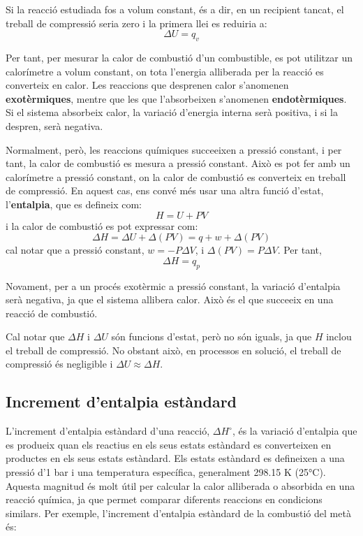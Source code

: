 Si la reacció estudiada fos a volum constant, és a dir, en un recipient tancat, el treball de compressió seria zero i la primera llei es reduiria a:
\begin{equation}
    \Delta U = q_v
\end{equation}

Per tant, per mesurar la calor de combustió d'un combustible, es pot utilitzar un calorímetre a volum constant, on tota l'energia alliberada per la reacció es converteix en calor. Les reaccions que desprenen calor s'anomenen \textbf{exotèrmiques}, mentre que les que l'absorbeixen s'anomenen \textbf{endotèrmiques}. Si el sistema absorbeix calor, la variació d'energia interna serà positiva, i si la despren, serà negativa.

Normalment, però, les reaccions químiques succeeixen a pressió constant, i per tant, la calor de combustió es mesura a pressió constant. Això es pot fer amb un calorímetre a pressió constant, on la calor de combustió es converteix en treball de compressió. En aquest cas, ens convé més usar una altra funció d'estat, l'{\bf entalpia}, que es defineix com:
\begin{equation}
    H = U + PV
\end{equation}
i la calor de combustió es pot expressar com:
\begin{equation}
    \Delta H = \Delta U + \Delta (PV) = q+ w + \Delta (PV) \end{equation}
    cal notar que a pressió constant, $w = -P \Delta V$, i $\Delta (PV)=P\Delta V$. Per tant,
    \begin{equation}
    \Delta H = q_p
\end{equation}

Novament, per a un procés exotèrmic a pressió constant, la variació d'entalpia serà negativa, ja que el sistema allibera calor. Això és el que succeeix en una reacció de combustió.

Cal notar que $\Delta H$ i $\Delta U$ són funcions d'estat, però no són iguals, ja que $H$ inclou el treball de compressió. No obstant això, en processos en solució, el treball de compressió és negligible i $\Delta U \approx \Delta H$.

\subsection{Increment d'entalpia estàndard}

L'increment d'entalpia estàndard d'una reacció, $\Delta H^\circ$, és la variació d'entalpia que es produeix quan els reactius en els seus estats estàndard es converteixen en productes en els seus estats estàndard. Els estats estàndard es defineixen a una pressió d'1 bar i una temperatura específica, generalment 298.15 K (25°C). Aquesta magnitud és molt útil per calcular la calor alliberada o absorbida en una reacció química, ja que permet comparar diferents reaccions en condicions similars. Per exemple, l'increment d'entalpia estàndard de la combustió del metà és:

